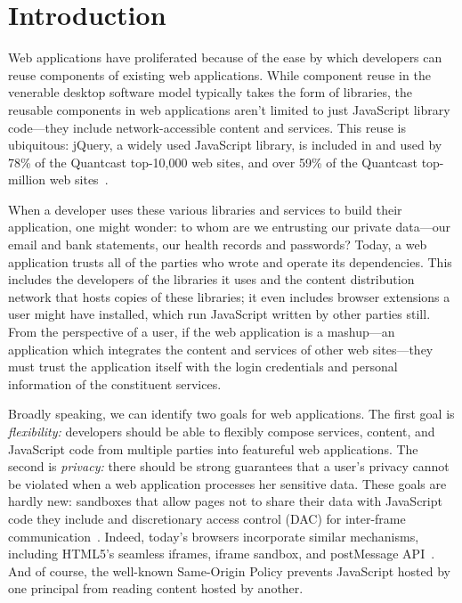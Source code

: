 \section{Introduction}
\label{sec:intro}

Web applications have proliferated because of the ease by which
developers can reuse components of existing web applications.
%
While component reuse in the venerable desktop software model typically
takes the form of libraries, the reusable components in web applications
aren't limited to just JavaScript library code---they include
network-accessible content and services.
%
This reuse is ubiquitous\@: jQuery, a widely used JavaScript
library, is included in and used by 78\% of the Quantcast top-10,000
web sites, and over 59\% of the Quantcast top-million web
sites~\cite{quantcast}.

When a developer uses these various libraries and services to build
their application, one might wonder: to whom are we entrusting our
private data---our email and bank statements, our health records and
passwords?
%
Today, a web application trusts all of the parties who wrote and
operate its dependencies.
%
This includes the developers of the libraries it uses and the content
distribution network that hosts copies of these libraries; it even
includes browser extensions a user might have installed, which run
JavaScript written by other parties still.
%
From the perspective of a user, if the web application is a mashup---an
application which integrates the content and services of other web
sites---they must trust the application itself with the login
credentials and personal information of the constituent services.

 Broadly speaking, we can identify two goals for web applications.
%
The first goal is {\em flexibility:\/} developers should be able to
flexibly compose services, content, and JavaScript code from multiple
parties into featureful web applications.
%
The second is {\em privacy:\/} there should be strong guarantees that a
user's privacy cannot be violated when a web application processes her
sensitive data.
%
These goals are hardly new: 
sandboxes that allow pages not to share their data with JavaScript code
they include and discretionary access control (DAC) for inter-frame
communication~\cite{mashupos}.
%
Indeed, today's browsers incorporate similar mechanisms, including
HTML5's seamless iframes, iframe sandbox, and postMessage
API~\cite{html5}.
%
And of course, the well-known Same-Origin Policy prevents JavaScript
hosted by one principal from reading content hosted by another.


